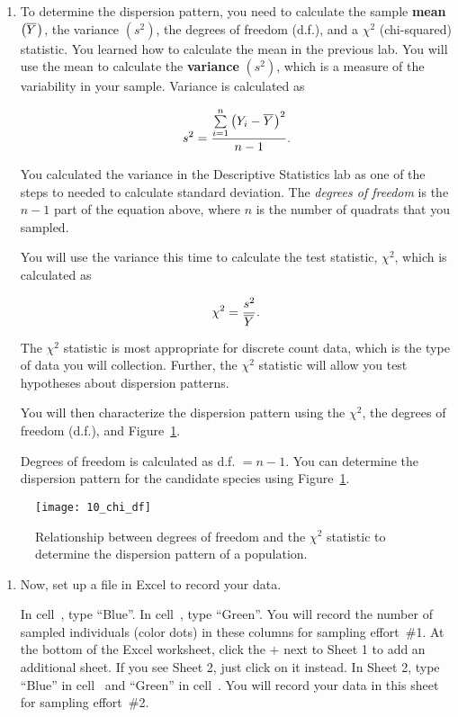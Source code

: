 \documentclass[12pt, hidelinks]{exam}
\newcommand\chisq{$\chi^2$}
\newcommand*\meanY{\overline{Y}\kern0.67pt}
\newcommand*\xcell[1]{cell~\liningnum{#1}}
\begin{document}
\begin{enumerate}

\item To determine the dispersion pattern, you need to calculate the sample
\textbf{mean} $\left( \meanY\right)$, the variance $(s^2)$, the degrees of freedom (d.f.), 
and a \chisq{} (chi-squared) statistic. You learned how to calculate the mean in the previous lab. You will use
the mean to calculate the \textbf{variance} $(s^2)$, which is a measure of the variability in your sample. Variance is calculated as 

\[s^2 =  \frac{\sum\limits_{i=1}^n \left( Y_i - \meanY \right)^2}{n-1}. \]

You calculated the variance in the Descriptive Statistics lab as one of the steps to needed to calculate standard deviation. The \emph{degrees of freedom} is the $n-1$ part of the equation above, where $n$ is the number of quadrats that you sampled.

You will use the variance this time to calculate the test statistic, \chisq{}, which is calculated
as

\[ \chi^2 = \dfrac{s^2}{\meanY}. \] %

The \chisq{} statistic is most appropriate for discrete count data, which is the type of data you will collection. Further, the \chisq{} statistic will allow you test hypotheses about dispersion patterns. 

You will then characterize the dispersion pattern using the
\chisq{}, the degrees of freedom (d.f.), and Figure~\ref{fig:chi_df}.

Degrees of freedom is calculated as d.f. $= n-1.$  You can determine the dispersion pattern for the candidate species using Figure~\ref{fig:chi_df}.  

\end{enumerate}

\begin{figure}[h!]
	\begin{center}
	\captionsetup{width=0.7\textwidth}
	\texttt{[image: 10\_chi\_df]}
	\caption{Relationship between degrees of freedom and the \chisq{}
statistic to determine the dispersion pattern of a
population.}\label{fig:chi_df}
	\end{center}
\end{figure}

\begin{enumerate}[resume]

\item Now, set up a file in Excel to record your data.

In \xcell{A1}, type “Blue”. In \xcell{D1}, type “Green”. You will record the number of sampled individuals (color dots) in these columns for sampling effort~\#1. At the bottom of the Excel worksheet, click the $+$ next to Sheet 1 to add an additional sheet. If you see Sheet 2, just click on it instead. In Sheet 2,
type “Blue” in \xcell{A1} and “Green” in \xcell{D1}. You will record your data
in this sheet for sampling effort~\#2.

\end{enumerate}
\end{document}
